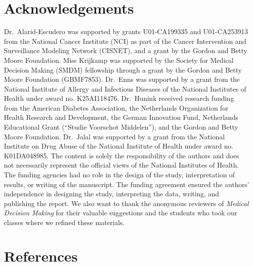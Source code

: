 \documentclass[
]{article}
\begin{document}
\hypertarget{acknowledgements}{%
\section{Acknowledgements}\label{acknowledgements}}

Dr.~Alarid-Escudero was supported by grants U01-CA199335 and U01-CA253913 from the National Cancer Institute (NCI) as part of the Cancer Intervention and Surveillance Modeling Network (CISNET), and a grant by the Gordon and Betty Moore Foundation. Miss Krijkamp was supported by the Society for Medical Decision Making (SMDM) fellowship through a grant by the Gordon and Betty Moore Foundation (GBMF7853). Dr.~Enns was supported by a grant from the National Institute of Allergy and Infectious Diseases of the National Institutes of Health under award no. K25AI118476. Dr.~Hunink received research funding from the American Diabetes Association, the Netherlands Organization for Health Research and Development, the German Innovation Fund, Netherlands Educational Grant (``Studie Voorschot Middelen''), and the Gordon and Betty Moore Foundation. Dr.~Jalal was supported by a grant from the National Institute on Drug Abuse of the National Institute of Health under award no. K01DA048985. The content is solely the responsibility of the authors and does not necessarily represent the official views of the National Institutes of Health. The funding agencies had no role in the design of the study, interpretation of results, or writing of the manuscript. The funding agreement ensured the authors' independence in designing the study, interpreting the data, writing, and publishing the report. We also want to thank the anonymous reviewers of \emph{Medical Decision Making} for their valuable suggestions and the students who took our classes where we refined these materials.

\hypertarget{references}{%
\section*{References}\label{references}}
\end{document}
